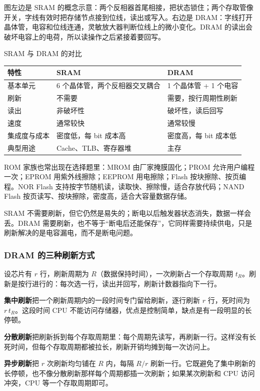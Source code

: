 图左边是 SRAM 的概念示意：两个反相器首尾相接，把状态锁住；两个存取管像开关，字线有效时把存储节点接到位线，读出或写入。右边是 DRAM：字线打开晶体管，电容和位线连通，灵敏放大器判断位线上的微小变化。DRAM 的读出会破坏电容上的电荷，所以读操作之后紧接着要回写。

\begin{tablebox}{SRAM 与 DRAM 的对比}
\centering
\begin{tabularx}{\linewidth}{|p{2.4cm}|X|X|}
\hline
特性 & SRAM & DRAM \\
\hline
基本单元 & 6 个晶体管，两个反相器交叉耦合 & 1 个晶体管 + 1 个电容 \\
刷新 & 不需要 & 需要，按行周期性刷新 \\
读出 & 非破坏性 & 破坏性，读后回写 \\
速度 & 通常较快 & 通常较慢 \\
集成度与成本 & 密度低，每 bit 成本高 & 密度高，每 bit 成本低 \\
典型用途 & Cache、TLB、寄存器堆 & 主存 \\
\hline
\end{tabularx}
\end{tablebox}

ROM 家族也常出现在选择题里：MROM 由厂家掩膜固化；PROM 允许用户编程一次；EPROM 用紫外线擦除；EEPROM 用电擦除；Flash 按块擦除、按页编程。NOR Flash 支持按字节随机读，读取快、擦除慢，适合存放代码；NAND Flash 按页读写、按块擦除，密度高，适合大容量数据存储。

SRAM 不需要刷新，但它仍然是易失的；断电以后触发器状态消失，数据一样会丢。DRAM 需要刷新，也不等于“断电后还能保存”，它同样需要持续供电，只是刷新解决的是电容漏电，而不是断电问题。

\subsubsection*{DRAM 的三种刷新方式}

设芯片有 \(r\) 行，刷新周期为 \(R\)（数据保持时间），一次刷新占一个存取周期 \(t_R\)。刷新是按行进行的：每次选一行，读出并回写，刷新计数器指向下一行。

\textbf{集中刷新}把一个刷新周期内的一段时间专门留给刷新，逐行刷新 \(r\) 行，死时间为 \(r\,t_R\)。这段时间 CPU 不能访问存储器，优点是控制简单，缺点是有一段明显的长停顿。

\textbf{分散刷新}把刷新拆到每个存取周期里：每个周期先读写，再刷新一行。这样没有长死时间，但每个存取周期都被拉长，刷新开销均摊到每一次访问上。

\textbf{异步刷新}把 \(r\) 次刷新均匀铺在 \(R\) 内，每隔 \(R/r\) 刷新一行。它既避免了集中刷新的长停顿，也不像分散刷新那样每个周期都插一次刷新；如果某次刷新和 CPU 访问冲突，CPU 等一个存取周期即可。

